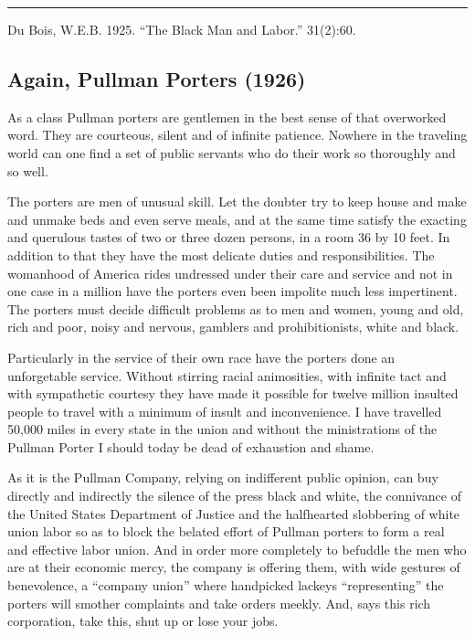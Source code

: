 \documentclass[letterpaper,10pt,english]{jupyterBook}
\begin{document}
\bigskip\hrule\bigskip


\sphinxAtStartPar
{} Du Bois, W.E.B. 1925. “The Black Man and Labor.”  31(2):60.


\subsection{Again, Pullman Porters (1926)}
\label{\detokenize{Volumes/31/06/again_pullman_porters:again-pullman-porters-1926}}\label{\detokenize{Volumes/31/06/again_pullman_porters::doc}}
\sphinxAtStartPar
As a class Pullman porters are gentlemen in the best sense of that overworked word. They are courteous, silent and of infinite patience. Nowhere in the traveling world can one find a set of public servants who do their work so thoroughly and so well.

\sphinxAtStartPar
The porters are men of unusual skill. Let the doubter try to keep house and make and unmake beds and even serve meals, and at the same time satisfy the exacting and querulous tastes of two or three dozen persons, in a room 36 by 10 feet. In addition to that they have the most delicate duties and responsibilities. The womanhood of America rides undressed under their care and service and not in one case in a million have the porters even been impolite much less impertinent. The porters must decide difficult problems as to men and women, young and old, rich and poor, noisy and nervous, gamblers and prohibitionists, white and black.

\sphinxAtStartPar
Particularly in the service of their own race have the porters done an unforgetable service. Without stirring racial animosities, with infinite tact and with sympathetic courtesy they have made it possible for twelve million insulted people to travel with a minimum of insult and inconvenience. I have travelled 50,000 miles in every state in the union and without the ministrations of the Pullman Porter I should today be dead of exhaustion and shame.

\sphinxAtStartPar
As it is the Pullman Company, relying on indifferent public opinion, can buy directly and indirectly the silence of the press black and white, the connivance of the United States Department of Justice and the halfhearted slobbering of white union labor so as to block the belated effort of Pullman porters to form a real and effective labor union. And in order more completely to befuddle the men who are at their economic mercy, the company is offering them, with wide gestures of benevolence, a “company union” where hand\sphinxhyphen{}picked lackeys “representing” the porters will smother complaints and take orders meekly. And, says this rich corporation, take this, shut up or lose your jobs.
\end{document}
